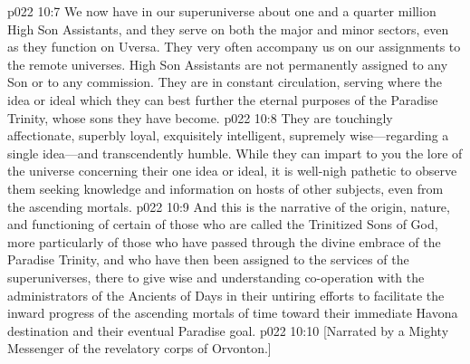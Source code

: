 \pc \vs p022 10:7 We now have in our superuniverse about one and a quarter million High Son Assistants, and they serve on both the major and minor sectors, even as they function on Uversa. They very often accompany us on our assignments to the remote universes. High Son Assistants are not permanently assigned to any Son or to any commission. They are in constant circulation, serving where the idea or ideal which they  can best further the eternal purposes of the Paradise Trinity, whose sons they have become.\plusone
\vs p022 10:8 They are touchingly affectionate, superbly loyal, exquisitely intelligent, supremely wise---regarding a single idea---and transcendently humble. While they can impart to you the lore of the universe concerning their one idea or ideal, it is well\hyp{}nigh pathetic to observe them seeking knowledge and information on hosts of other subjects, even from the ascending mortals.
\pc \vs p022 10:9 And this is the narrative of the origin, nature, and functioning of certain of those who are called the Trinitized Sons of God, more particularly of those who have passed through the divine embrace of the Paradise Trinity, and who have then been assigned to the services of the superuniverses, there to give wise and understanding co\hyp{}operation with the administrators of the Ancients of Days in their untiring efforts to facilitate the inward progress of the ascending mortals of time toward their immediate Havona destination and their eventual Paradise goal.
\vsetoff
\vs p022 10:10 [Narrated by a Mighty Messenger of the revelatory corps of Orvonton.]
